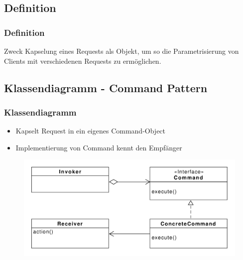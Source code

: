 \subsection{Definition}
\begin{frame}
  \frametitle{Definition}
  \begin{block}{Zweck}
  	Kapselung eines Requests als Objekt, um so die Parametrisierung von Clients mit verschiedenen Requests zu ermöglichen.
  \end{block}
  
\end{frame}

\subsection{Klassendiagramm - Command Pattern}
\begin{frame}
	\frametitle{Klassendiagramm}		
	\begin{itemize}
		\item Kapselt Request in ein eigenes Command-Object
		\item Implementierung von Command kennt den Empfänger
	\end{itemize}	
  	\begin{figure}
		\includegraphics[scale=.4]{paper/command/command}
	\end{figure}
\end{frame}

